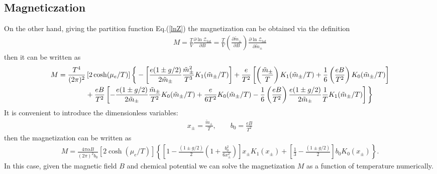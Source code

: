 \documentclass[Universe,article,submit,moreauthors,pdftex]{Definitions/mdpi}
\begin{document}
\subsection{Magneticzation}
On the other hand, giving the partition function Eq.(\ref{lnZ}) the magnetization can be obtained via the definition
\begin{align}
M=\frac{T}{V}\frac{\partial \ln\mathcal{Z}_{tot}}{\partial B}=\frac{T}{V}\left(\frac{\partial\tilde m_\pm}{\partial B}\right)\frac{\partial \ln\mathcal{Z}_{tot}}{\partial\tilde m_\pm}
\end{align}
then it can be written as
\begin{align}
M=\frac{T^4}{(2\pi)^2}&\left[2\cosh(\mu_e/T)\right]
\bigg\{-\left[\frac{e(1\pm g/2)}{2\tilde m_\pm}\frac{\tilde m_\pm^2}{T^3}K_1(\tilde m_\pm/T)\right]+\frac{e}{T^2} \left[\left(\frac{\tilde m_\pm}{T}\right)K_1(\tilde m_\pm/T)+\frac{1}{6}\left(\frac{eB}{T^2}\right)K_0(\tilde m_\pm/T)\right]\notag\\
&+\frac{eB}{T^2} \left[-\frac{e(1\pm g/2)}{2\tilde m_\pm}\frac{\tilde m_\pm}{T^2}K_0(\tilde m_\pm/T)+\frac{e}{6T^2}K_0(\tilde m_\pm/T)-\frac{1}{6}\left(\frac{eB}{T^2}\right)\frac{e(1\pm g/2)}{2\tilde m_\pm}\frac{1}{T}K_1(\tilde m_\pm/T)\right]\bigg\}
\end{align}
It is convenient to introduce the dimensionless variables:
\begin{align}
x_\pm=\frac{\tilde m_\pm}{T},\qquad b_0=\frac{eB}{T^2}
\end{align}
then the magnetization can be written as
\begin{align}
M=\frac{4\pi\alpha B}{(2\pi)^2b_0}\left[2\cosh(\mu_e/T)\right]\left\{\left[1-\frac{(1\pm g/2)}{2}\left(1+\frac{b^2_0}{6x^2_\pm}\right)\right]x_\pm K_1(x_\pm)+\left[\frac{1}{3}-\frac{(1\pm g/2)}{2}\right]b_0K_0(x_\pm)\right\}.
\end{align}
In this case, given the magnetic field $B$ and chemical potential we can solve the magnetization $M$ as a function of temperature numerically.

\end{document}
